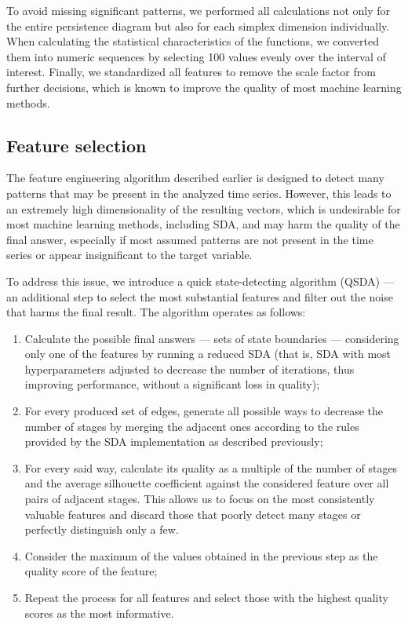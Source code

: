 \documentclass[10pt]{iopart}
\begin{document}
To avoid missing significant patterns, we performed all calculations not only for the entire persistence diagram but also for each simplex dimension individually. When calculating the statistical characteristics of the functions, we converted them into numeric sequences by selecting 100 values evenly over the interval of interest. Finally, we standardized all features to remove the scale factor from further decisions, which is known to improve the quality of most machine learning methods.

\subsection{Feature selection}

The feature engineering algorithm described earlier is designed to detect many patterns that may be present in the analyzed time series. However, this leads to an extremely high dimensionality of the resulting vectors, which is undesirable for most machine learning methods, including SDA, and may harm the quality of the final answer, especially if most assumed patterns are not present in the time series or appear insignificant to the target variable.

To address this issue, we introduce a quick state-detecting algorithm (QSDA) --- an additional step to select the most substantial features and filter out the noise that harms the final result. The algorithm operates as follows:
\begin{enumerate}
    \item 
        Calculate the possible final answers --- sets of state boundaries --- considering only one of the features by running a reduced SDA (that is, SDA with most hyperparameters adjusted to decrease the number of iterations, thus improving performance, without a significant loss in quality);
    \item
        For every produced set of edges, generate all possible ways to decrease the number of stages by merging the adjacent ones according to the rules provided by the SDA implementation as described previously;
    \item
        For every said way, calculate its quality as a multiple of the number of stages and the average silhouette coefficient against the considered feature over all pairs of adjacent stages. This allows us to focus on the most consistently valuable features and discard those that poorly detect many stages or perfectly distinguish only a few.
    \item 
        Consider the maximum of the values obtained in the previous step as the quality score of the feature;
    \item
        Repeat the process for all features and select those with the highest quality scores as the most informative.
\end{enumerate}
\end{document}
